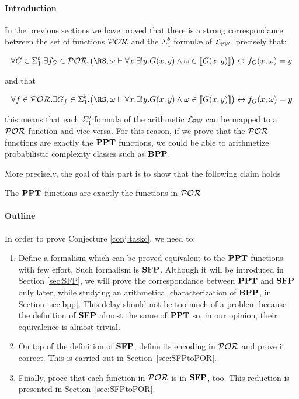 \begin{conditional}{\notappendix}
  \paragraph{Introduction}
  In the previous sections we have proved that
  there is a strong correspondance between the
  set of functions $\mathcal{POR}$ and the $\Sigma^b_1$
  formul\ae{} of $\mathcal{L}_{\mathbb{PW}}$, precisely that:

  \[
  \forall G \in \Sigma^b_1. \exists f_G \in \POR. \big(\RS, \omega \vdash \forall x. \exists ! y. G(x, y) \land \omega \in \llbracket G(x, y) \rrbracket\big)  \leftrightarrow f_G(x, \omega) = y
  \]

  and that

  \[
  \forall f \in \POR.\exists G_f \in \Sigma^b_1. \big(\RS, \omega \vdash \forall x. \exists ! y. G(x, y) \land \omega \in \llbracket G(x, y) \rrbracket\big) \leftrightarrow f_G(x, \omega) = y
  \]


   this means that each $\Sigma^b_1$ formula of the arithmetic $\mathcal{L}_{\mathbb{PW}}$
   can be mapped to a $\mathcal{POR}$ function and vice-versa. For this reason,
   if we prove that the $\mathcal{POR}$ functions are exactly the $\mathbf{PPT}$ functions,
   we could be able to arithmetize probabilistic complexity classes such as
   $\mathbf{BPP}$.

   More precisely, the goal of this part is to show that the following
   claim holds

  \begin{conj}
    \label{conj:taskc}
    The $\mathbf{PPT}$ functions are exactly the functions in $\mathcal{POR}$
  \end{conj}
\end{conditional}
\begin{conditional}{\extendedorsup}

   \paragraph{Outline}

   In order to prove Conjecture \ref{conj:taskc}, we need to:

   \begin{enumerate}
     \item Define a formalism which can be proved equivalent to the
     $\mathbf{PPT}$ functions with few effort. Such formalism is $\mathbf{SFP}$. Although
     it will be introduced in Section \ref{sec:SFP}, we will prove the
     correspondance between $\mathbf{PPT}$ and $\mathbf{SFP}$ only later,
     while studying an arithmetical characterization
     of $\mathbf{BPP}$, in Section \ref{sec:bpp}. This delay should not be too much of a problem
     because the definition of $\mathbf{SFP}$ almost the same of $\mathbf{PPT}$ so, in our opinion,
     their equivalence is almost trivial.
     \item On top of the definition of $\mathbf{SFP}$, define its encoding in $\mathcal{POR}$
     and prove it correct. This is carried out in Section~\ref{sec:SFPtoPOR}.
     \item Finally, proce that each function in $\mathcal{POR}$ is in $\mathbf{SFP}$, too.
     This reduction is presented in Section~\ref{sec:SFPtoPOR}.
   \end{enumerate}
\end{conditional}
